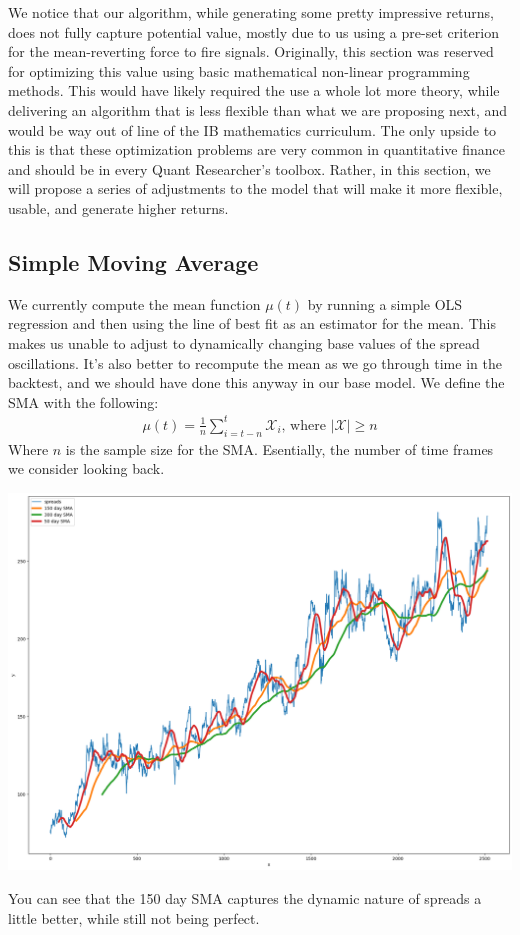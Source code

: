\documentclass{article}
\begin{document}
\begin{spacing}{2.0}
We notice that our algorithm, while generating some pretty impressive returns, does not fully capture potential value, mostly due to us using a pre-set criterion for the mean-reverting
force to fire signals. Originally, this section was reserved for optimizing this value using basic mathematical non-linear programming methods. This would have likely required the use
a whole lot more theory, while delivering an algorithm that is less flexible than what we are proposing next, and would be way out of line of the IB mathematics curriculum. The only
upside to this is that these optimization problems are very common in quantitative finance and should be in every Quant Researcher's toolbox. Rather, in this section, we will propose
a series of adjustments to the model that will make it more flexible, usable, and generate higher returns.

\subsection{Simple Moving Average}

We currently compute the mean function $\mu(t)$ by running a simple OLS regression and then using the line of best fit as an estimator for the mean. This makes us unable to adjust
to dynamically changing base values of the spread oscillations. It's also better to recompute the mean as we go through time in the backtest, and we should have done this anyway in
our base model. We define the SMA with the following:
\begin{gather*}
    \mu(t) = \frac{1}{n} \sum_{i = t - n}^{t} \mathcal{X}_{i} \text{, where } |\mathcal{X}| \ge n
\end{gather*}
Where $n$ is the sample size for the SMA. Esentially, the number of time frames we consider looking back.
\begin{center}
    \includegraphics[scale=0.38]{./images/spreads_sma.png}
\end{center}
You can see that the 150 day SMA captures the dynamic nature of spreads a little better, while still not being perfect.


\end{spacing}
\end{document}

